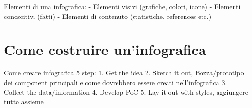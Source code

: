 
Elementi di una infografica:
-	Elementi visivi (grafiche, colori, icone)
-	Elementi conoscitivi (fatti)
-	Elementi di contenuto (statistiche, references etc.)


\section{Come costruire un'infografica}

Come creare infografica
5 step:
1.	Get the idea
2.	Sketch it out, Bozza/prototipo dei component principali e come dovrebbero essere creati nell'infografica
3.	Collect the data/information
4.	Develop PoC
5.	Lay it out with styles, aggiungere tutto assieme

